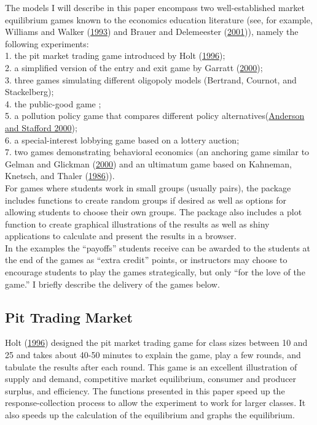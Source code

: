 \documentclass[
]{article}
\begin{document}
The models I will describe in this paper encompass two well-established
market equilibrium games known to the economics education literature
(see, for example, Williams and Walker
(\protect\hyperlink{ref-williams_economic_1993}{1993}) and Brauer and
Delemeester (\protect\hyperlink{ref-brauer_games_2001}{2001})), namely
the following experiments:\\
1. the pit market trading game introduced by Holt
(\protect\hyperlink{ref-holt_classroom_1996}{1996});\\
2. a simplified version of the entry and exit game by Garratt
(\protect\hyperlink{ref-garratt_free_2000}{2000});\\
3. three games simulating different oligopoly models (Bertrand, Cournot,
and Stackelberg);\\
4. the public-good game ;\\
5. a pollution policy game that compares different policy
alternatives(\protect\hyperlink{ref-anderson2000}{Anderson and Stafford
2000});\\
6. a special-interest lobbying game based on a lottery auction;\\
7. two games demonstrating behavioral economics (an anchoring game
similar to Gelman and Glickman
(\protect\hyperlink{ref-gelman2000}{2000}) and an ultimatum game based
on Kahneman, Knetsch, and Thaler
(\protect\hyperlink{ref-kahneman1986}{1986})).\\
For games where students work in small groups (usually pairs), the
package includes functions to create random groups if desired as well as
options for allowing students to choose their own groups. The package
also includes a plot function to create graphical illustrations of the
results as well as shiny applications to calculate and present the
results in a browser.\\
In the examples the ``payoffs'' students receive can be awarded to the
students at the end of the games as ``extra credit'' points, or
instructors may choose to encourage students to play the games
strategically, but only ``for the love of the game.'' I briefly describe
the delivery of the games below.

\hypertarget{pit-trading-market}{%
\subsection{Pit Trading Market}\label{pit-trading-market}}

Holt (\protect\hyperlink{ref-holt_classroom_1996}{1996}) designed the
pit market trading game for class sizes between 10 and 25 and takes
about 40-50 minutes to explain the game, play a few rounds, and tabulate
the results after each round. This game is an excellent illustration of
supply and demand, competitive market equilibrium, consumer and producer
surplus, and efficiency. The functions presented in this paper speed up
the response-collection process to allow the experiment to work for
larger classes. It also speeds up the calculation of the equilibrium and
graphs the equilibrium.
\end{document}
